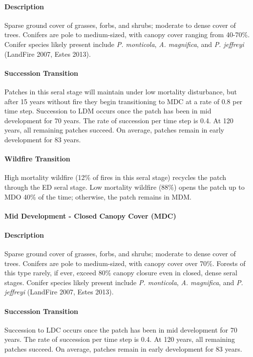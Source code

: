 \paragraph{Description} Sparse ground cover of grasses, forbs, and shrubs; moderate to dense cover of trees. Conifers are pole to medium-sized, with canopy cover ranging from 40-70\%. Conifer species likely present include \emph{P. monticola}, \emph{A. magnifica}, and \emph{P. jeffreyi} (LandFire 2007, Estes 2013).

\paragraph{Succession Transition} Patches in this seral stage will maintain under low mortality disturbance, but after 15 years without fire they begin transitioning to MDC at a rate of 0.8 per time step. Succession to LDM occurs once the patch has been in mid development for 70 years. The rate of succession per time step is 0.4. At 120 years, all remaining patches succeed. On average, patches remain in early development for 83 years.

\paragraph{Wildfire Transition} High mortality wildfire (12\% of fires in this seral stage) recycles the patch through the ED seral stage. Low mortality wildfire (88\%) opens the patch up to MDO 40\% of the time; otherwise, the patch remains in MDM.

\noindent\hrulefill

\paragraph{Mid Development - Closed Canopy Cover (MDC)}

\paragraph{Description} Sparse ground cover of grasses, forbs, and shrubs; moderate to dense cover of trees. Conifers are pole to medium-sized, with canopy cover over 70\%. Forests of this type rarely, if ever, exceed 80\% canopy closure even in closed, dense seral stages. Conifer species likely present include \emph{P. monticola}, \emph{A. magnifica}, and \emph{P. jeffreyi} (LandFire 2007, Estes 2013).

\paragraph{Succession Transition} Succession to LDC occurs once the patch has been in mid development for 70 years. The rate of succession per time step is 0.4. At 120 years, all remaining patches succeed. On average, patches remain in early development for 83 years.

